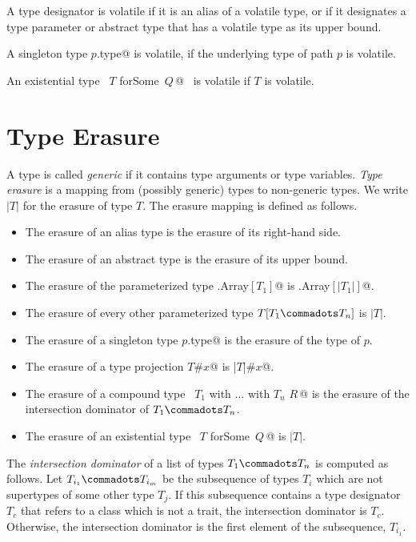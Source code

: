 A type designator is volatile if it is an alias of a volatile type, or
if it designates a type parameter or abstract type that has a volatile type as its
upper bound.

A singleton type \lstinline@$p$.type@ is volatile, if the underlying
type of path $p$ is volatile.

An existential type ~\lstinline@$T$ forSome {$\,Q\,$}@~ is volatile if
$T$ is volatile.

\section{Type Erasure}
\label{sec:erasure}

A type is called {\em generic} if it contains type arguments or type variables.
{\em Type erasure} is a mapping from (possibly generic) types to
non-generic types. We write $|T|$ for the erasure of type $T$.
The erasure mapping is defined as follows.
\begin{itemize}
\item The erasure of an alias type is the erasure of its right-hand side. %
\item The erasure of an abstract type is the erasure of its upper bound.
\item The erasure of the parameterized type \lstinline@scala.Array$[T_1]$@ is
 \lstinline@scala.Array$[|T_1|]$@.
 \item The erasure of every other parameterized type $T[T_1 \commadots T_n]$ is $|T|$.
\item The erasure of a singleton type \lstinline@$p$.type@ is the 
      erasure of the type of $p$.
\item The erasure of a type projection \lstinline@$T$#$x$@ is \lstinline@|$T$|#$x$@.
\item The erasure of a compound type 
~\lstinline@$T_1$ with $\ldots$ with $T_n$ {$R\,$}@ is the erasure of the intersection dominator of
  $T_1 \commadots T_n$.
\item The erasure of an existential type ~\lstinline@$T$ forSome {$\,Q\,$}@ 
      is $|T|$.
\end{itemize}

The {\em intersection dominator} of a list of types $T_1 \commadots
T_n$ is computed as follows.
Let $T_{i_1} \commadots T_{i_m}$ be the subsequence of types $T_i$  
which are not supertypes of some other type $T_j$. 
If this subsequence contains a type designator $T_c$ that refers to a class which is not a trait, 
the intersection dominator is $T_c$. Otherwise, the intersection
dominator is the first element of the subsequence, $T_{i_1}$.


